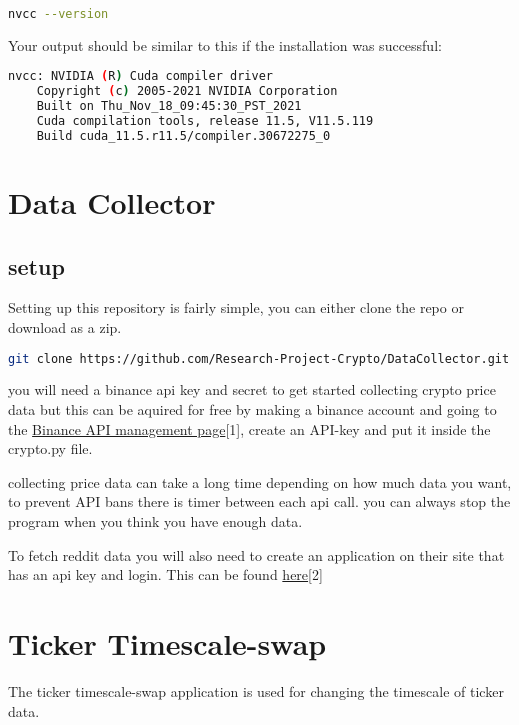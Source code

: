 \documentclass[12pt,a4paper]{article}
\begin{document}
\begin{lstlisting}[language=bash]
    nvcc --version
\end{lstlisting}

Your output should be similar to this if the installation was successful:

\begin{lstlisting}[language=bash]
	nvcc: NVIDIA (R) Cuda compiler driver
	Copyright (c) 2005-2021 NVIDIA Corporation
	Built on Thu_Nov_18_09:45:30_PST_2021
	Cuda compilation tools, release 11.5, V11.5.119
	Build cuda_11.5.r11.5/compiler.30672275_0
\end{lstlisting}



\section{Data Collector}

\subsection{setup}
Setting up this repository is fairly simple, you can either clone the repo or download as a zip.

\begin{lstlisting}[language=bash]
git clone https://github.com/Research-Project-Crypto/DataCollector.git 
\end{lstlisting}

you will need a binance api key and secret to get started collecting crypto price data but this can be aquired for free by making a binance account and going to the \href{https://www.binance.com/en/my/settings/api-management}{Binance API management page}[1], create an API-key and put it inside the crypto.py file.

collecting price data can take a long time depending on how much data you want, to prevent API bans there is timer between each api call. you can always stop the program when you think you have enough data.

To fetch reddit data you will also need to create an application on their site that has an api key and login. This can be found \href{https://www.reddit.com/prefs/apps}{here}[2]

\section{Ticker Timescale-swap}

The ticker timescale-swap application is used for changing the timescale of ticker data.
\end{document}
